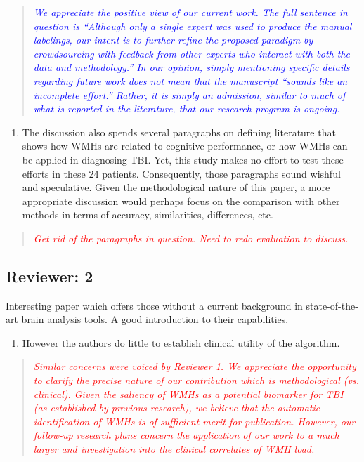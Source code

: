 \documentclass[12pt,]{article}
\providecommand{\tightlist}{%
  \setlength{\itemsep}{0pt}\setlength{\parskip}{0pt}}
\begin{document}
\begin{quote}
\emph{\textcolor{blue}{We appreciate the positive view of our current work.
The full sentence in question is ``Although only a
single expert was used to produce the manual labelings, our intent is to
further refine the proposed paradigm by crowdsourcing with feedback from
other experts who interact with both the data and methodology.''
In our opinion, simply mentioning specific details regarding future work
does not mean that the manuscript ``sounds like an incomplete effort.''
Rather, it is simply an admission, similar to much of what is reported
in the literature, that our research program is ongoing.}}
\end{quote}

\begin{enumerate}
\def\labelenumi{\arabic{enumi}.}
\setcounter{enumi}{14}
\tightlist
\item
  The discussion also spends several paragraphs on defining literature
  that shows how WMHs are related to cognitive performance, or how WMHs
  can be applied in diagnosing TBI. Yet, this study makes no effort to
  test these efforts in these 24 patients. Consequently, those
  paragraphs sound wishful and speculative. Given the methodological
  nature of this paper, a more appropriate discussion would perhaps
  focus on the comparison with other methods in terms of accuracy,
  similarities, differences, etc.
\end{enumerate}

\begin{quote}
\emph{\textcolor{red}{Get rid of the paragraphs in question.  Need to redo evaluation
to discuss.}}
\end{quote}

\subsection{Reviewer: 2}\label{reviewer-2}

Interesting paper which offers those without a current background in
state-of-the-art brain analysis tools. A good introduction to their
capabilities.

\begin{enumerate}
\def\labelenumi{\arabic{enumi}.}
\tightlist
\item
  However the authors do little to establish clinical utility of the
  algorithm.
\end{enumerate}

\begin{quote}
\emph{\textcolor{red}{Similar concerns were voiced by Reviewer 1.  We appreciate
the opportunity to clarify the precise nature of our contribution which is methodological
(vs. clinical).  Given the saliency of WMHs as a potential biomarker for TBI
(as established by previous research), we believe that the automatic identification
of WMHs is of sufficient merit for publication.  However, our follow-up research plans
concern the application of our work to a much larger and investigation into the clinical
correlates of WMH load.}}
\end{quote}
\end{document}
